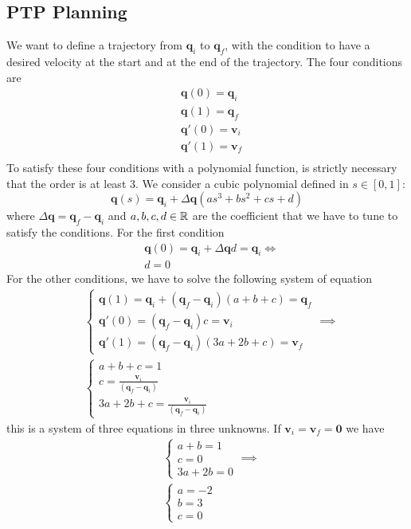 \documentclass[10pt, letterpaper]{report}
\begin{document}
\subsection{PTP Planning}
We want to define a trajectory from $\mathbf q_i$ to $\mathbf q_f$, with the condition to have a desired velocity  at the start and at the end of the trajectory. The four conditions are\begin{align}
    &\mathbf q(0)=\mathbf q_i\\
    &\mathbf q(1)=\mathbf q_f\\
    &\mathbf q'(0)=\mathbf v_i\\
    &\mathbf q'(1)=\mathbf v_f\\
\end{align}
To satisfy these four conditions with a polynomial function, is strictly necessary that the order is at least 3. We consider a cubic polynomial defined in $s\in[0,1]$:\begin{equation}
    \mathbf q(s)=\mathbf q_i+\Delta\mathbf q(
        as^3+bs^2+cs+d
    )
\end{equation}
where $\Delta\mathbf q=\mathbf q_f-\mathbf q_i$ and $a,b,c,d\in {\mathbb R}$ are the coefficient that we have to tune to satisfy the conditions. For the first condition \begin{align}
    &\mathbf q(0)=\mathbf q_i+\Delta\mathbf qd=\mathbf q_i \iff \\ 
    &d=0
\end{align}
For the other conditions, we have to solve the following system of equation\begin{align}
    &\begin{cases}
        \mathbf q(1)=\mathbf q_i+(\mathbf q_f-\mathbf q_i)(
        a+b+c)=\mathbf q_f\\ 
        \mathbf q'(0)=(\mathbf q_f-\mathbf q_i)c=\mathbf v_i\\
        \mathbf q'(1)=(\mathbf q_f-\mathbf q_i)(3a+2b+c)=\mathbf v_f
    \end{cases}\implies\\ 
    &\begin{cases}
       a+b+c=1\\ 
       c=\frac{\mathbf v_i}{(\mathbf q_f-\mathbf q_i)}\\
    3a+2b+c=\frac{\mathbf v_i}{(\mathbf q_f-\mathbf q_i)}
    \end{cases}
\end{align}
this is a system of three equations in three unknowns. If $\mathbf v_i=\mathbf v_f=\mathbf 0$ we have\begin{align}
     &\begin{cases}
       a+b=1\\ 
       c=0\\
    3a+2b=0
    \end{cases}\implies\\ 
    &\begin{cases}
       a=-2\\b=3\\c=0
    \end{cases}
\end{align}
\end{document}
